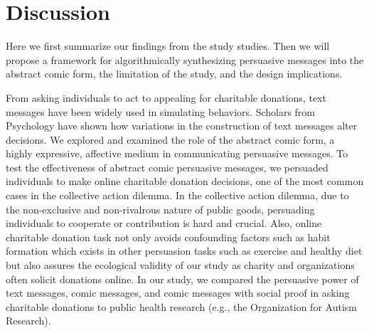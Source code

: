 \section{Discussion}
\label{sec:Discussion}
Here we first summarize our findings from the study studies. Then we will propose a framework for algorithmically synthesizing persuasive messages into the abstract comic form, the limitation of the study, and the design implications.


From asking individuals to act to appealing for charitable donations, text messages have been widely used in simulating behaviors. Scholars from Psychology have shown how variations in the construction of text messages alter decisions. We explored and examined the role of the abstract comic form, a highly expressive, affective medium in communicating persuasive messages. To test the effectiveness of abstract comic persuasive messages, we persuaded individuals to make online charitable donation decisions, one of the most common cases in the collective action dilemma. In the collective action dilemma, due to the non-exclusive and non-rivalrous nature of public goods, persuading individuals to cooperate or contribution is hard and crucial. Also, online charitable donation task not only avoids confounding factors such as habit formation which exists in other persuasion tasks such as exercise and healthy diet but also assures the ecological validity of our study as charity and organizations often solicit donations online. In our study, we compared the persuasive power of text messages, comic messages, and comic messages with social proof in asking charitable donations to public health research (e.g., the Organization for Autism Research).

